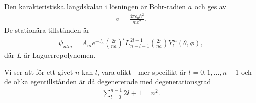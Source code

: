 Den karakteristiska längdskalan i lösningen är Bohr-radien $a$ och ges av
\begin{align*}
	a = \frac{4\pi\varepsilon_{0}\hbar^{2}}{me^{2}}.
\end{align*}
De stationära tillstånden är
\begin{align*}
	\psi_{nlm} = A_{nl}e^{-\frac{r}{na}}\left(\frac{2r}{na}\right)^{l}L_{n - l - 1}^{2l + 1}\left(\frac{2r}{na}\right)Y_{l}^{m}(\theta, \phi),
\end{align*}
där $L$ är Laguerrepolynomen.

Vi ser att för ett givet $n$ kan $l$, vara olikt - mer specifikt är $l = 0, 1, \dots, n - 1$ och de olika egentillstånden är då degenererade med degenerationsgrad
\begin{align*}
	\sum\limits_{l = 0}^{n - 1}2l + 1 = n^{2}.
\end{align*}